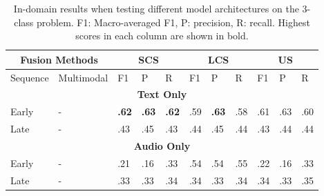 \documentclass{article}
\begin{document}
\begin{table}[h]
\centering
\caption{In-domain results when testing different model architectures on the 3-class problem. F1: Macro-averaged F1, P: precision, R: recall. Highest scores in each column are shown in bold.}
\begin{tabular}{|lllllllllll|}
\hline
\multicolumn{2}{|c|}{Fusion Methods}                                                       & \multicolumn{3}{c|}{\textbf{SCS}}                               & \multicolumn{3}{c|}{\textbf{LCS}}                               & \multicolumn{3}{c|}{\textbf{US}}           \\ \hline
\multicolumn{1}{|l|}{Sequence}               & \multicolumn{1}{l|}{Multimodal}    & F1           & P            & \multicolumn{1}{l|}{R}            & F1           & P            & \multicolumn{1}{l|}{R}            & F1           & P            & R            \\ \hline
\multicolumn{11}{|c|}{\textbf{Text Only}}                                                                                                                                                                                                                          \\ \hline
\multicolumn{1}{|l|}{Early}                  & \multicolumn{1}{l|}{-}             & \textbf{.62} & \textbf{.63} & \multicolumn{1}{l|}{\textbf{.62}} & .59          & \textbf{.63} & \multicolumn{1}{l|}{.58}          & .61          & .63          & .60          \\
\multicolumn{1}{|l|}{Late}                   & \multicolumn{1}{l|}{-}             & .43          & .45          & \multicolumn{1}{l|}{.43}             & .44          & .45          & \multicolumn{1}{l|}{.44}             & .43          & .44          & .44          \\ \hline
\multicolumn{11}{|c|}{\textbf{Audio Only}}                                                                                                                                                                                                                         \\ \hline
\multicolumn{1}{|l|}{Early}                  & \multicolumn{1}{l|}{-}             & .21          & .16          & \multicolumn{1}{l|}{.33}          & .54          & .54          & \multicolumn{1}{l|}{.55}          & .22          & .16          & .33          \\
\multicolumn{1}{|l|}{Late}                   & \multicolumn{1}{l|}{-}             & .33          & .33          & \multicolumn{1}{l|}{.34}             & .34          & .33           & \multicolumn{1}{l|}{.34}             & .34          & .33          & .35          \\ \hline

\end{tabular}
\end{table}
\end{document}
